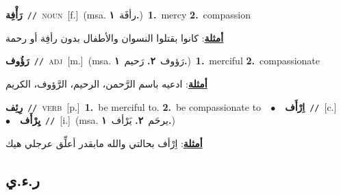 \documentclass[10pt,a4paper,twoside]{article} %
\begin{document}
\begin{multicols}{2}
{\setlength\topsep{0pt}\textbf{\foreignlanguage{arabic}{رَأْفِة}}\ {\color{gray}\texttt{//}\color{black}}\ \textsc{noun}\ [f.]\ \color{gray}(msa. \foreignlanguage{arabic}{رأفَة}~\foreignlanguage{arabic}{\textbf{١.}})\color{black}\ \textbf{1.}~mercy  \textbf{2.}~compassion\  \begin{flushright}\color{gray}\foreignlanguage{arabic}{\textbf{\underline{\foreignlanguage{arabic}{أمثلة}}}: كانوا بقتلوا النسوان والأطفال بدون رأفِة أو رحمة}\end{flushright}\color{black}} \vspace{2mm}

{\setlength\topsep{0pt}\textbf{\foreignlanguage{arabic}{رَؤُوف}}\ {\color{gray}\texttt{//}\color{black}}\ \textsc{adj}\ [m.]\ \color{gray}(msa. \foreignlanguage{arabic}{رَؤوف}~\foreignlanguage{arabic}{\textbf{٢.}}  \foreignlanguage{arabic}{رَحيم}~\foreignlanguage{arabic}{\textbf{١.}})\color{black}\ \textbf{1.}~merciful  \textbf{2.}~compassionate\  \begin{flushright}\color{gray}\foreignlanguage{arabic}{\textbf{\underline{\foreignlanguage{arabic}{أمثلة}}}: ادعيه باسم الرَّحمن، الرحيم، الرَّؤوف، الكريم}\end{flushright}\color{black}} \vspace{2mm}

{\setlength\topsep{0pt}\textbf{\foreignlanguage{arabic}{رِئِف}}\ {\color{gray}\texttt{//}\color{black}}\ \textsc{verb}\ [p.]\ \textbf{1.}~be merciful to.  \textbf{2.}~be compassionate to\ \ $\bullet$\ \ \setlength\topsep{0pt}\textbf{\foreignlanguage{arabic}{اِرْأَف}}\ {\color{gray}\texttt{//}\color{black}}\ [c.]\ \ $\bullet$\ \ \setlength\topsep{0pt}\textbf{\foreignlanguage{arabic}{يِرْأَف}}\ {\color{gray}\texttt{//}\color{black}}\ [i.]\ \color{gray}(msa. \foreignlanguage{arabic}{يرحَم}~\foreignlanguage{arabic}{\textbf{٢.}}  \foreignlanguage{arabic}{يَرْأف}~\foreignlanguage{arabic}{\textbf{١.}})\color{black}\  \begin{flushright}\color{gray}\foreignlanguage{arabic}{\textbf{\underline{\foreignlanguage{arabic}{أمثلة}}}: اِرْأف بحالتي والله مابقدر أعلِّق عرجلي هيك}\end{flushright}\color{black}} \vspace{2mm}

\vspace{-3mm}
\subsection*{\color{blue}\foreignlanguage{arabic}{ر.ء.ي}\color{blue}{}} 


\end{multicols}
\end{document}
